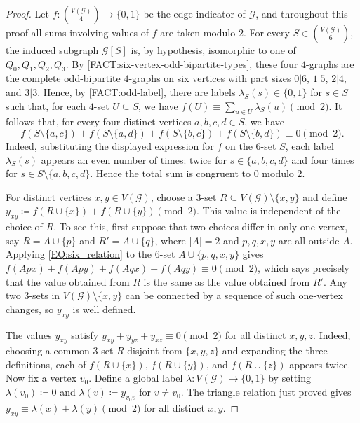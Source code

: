 \documentclass[10pt,a4paper]{article}
\theoremstyle{plain}
\theoremstyle{definition}
\begin{document}
\begin{proof}
Let $f:\binom{V(\mathcal G)}4\to\{0,1\}$ be the edge indicator of $\mathcal G$, and throughout this proof all sums involving values of $f$ are taken modulo $2$.  For every $S\in\binom{V(\mathcal G)}6$, the induced subgraph $\mathcal G[S]$ is, by hypothesis, isomorphic to one of $Q_0,Q_1,Q_2,Q_3$.  By \cref{FACT:six-vertex-odd-bipartite-types}, these four $4$-graphs are the complete odd-bipartite $4$-graphs on six vertices with part sizes $0|6$, $1|5$, $2|4$, and $3|3$.  Hence, by \cref{FACT:odd-label}, there are labels $\lambda_S(s)\in\{0,1\}$ for $s\in S$ such that, for each $4$-set $U\subseteq S$, we have $f(U)\equiv \sum_{u\in U}\lambda_S(u)\pmod 2$. 
It follows that, for every four distinct vertices $a,b,c,d\in S$, we have
\begin{equation}\label{EQ:six_relation}
f(S\setminus\{a,c\})+f(S\setminus\{a,d\})+f(S\setminus\{b,c\})+f(S\setminus\{b,d\})\equiv 0\pmod 2.
\end{equation}
Indeed, substituting the displayed expression for $f$ on the $6$-set $S$, each label $\lambda_S(s)$ appears an even number of times: twice for $s\in\{a,b,c,d\}$ and four times for $s\in S\setminus\{a,b,c,d\}$. Hence the total sum is congruent to $0$ modulo $2$.

For distinct vertices $x,y\in V(\mathcal G)$, choose a $3$-set $R\subseteq V(\mathcal G)\setminus\{x,y\}$ and define $y_{xy}\coloneqq f(R\cup\{x\})+f(R\cup\{y\})\pmod 2$.
This value is independent of the choice of $R$.  To see this, first suppose that two choices differ in only one vertex, say $R=A\cup\{p\}$ and $R'=A\cup\{q\}$, where $|A|=2$ and $p,q,x,y$ are all outside $A$.  Applying \eqref{EQ:six_relation} to the $6$-set $A\cup\{p,q,x,y\}$ gives $f(Apx)+f(Apy)+f(Aqx)+f(Aqy)\equiv 0\pmod 2$,
which says precisely that the value obtained from $R$ is the same as the value obtained from $R'$.  Any two $3$-sets in $V(\mathcal G)\setminus\{x,y\}$ can be connected by a sequence of such one-vertex changes, so $y_{xy}$ is well defined.

The values $y_{xy}$ satisfy $y_{xy}+y_{yz}+y_{xz}\equiv 0\pmod 2$ for all distinct $x,y,z$.  Indeed, choosing a common $3$-set $R$ disjoint from $\{x,y,z\}$ and expanding the three definitions, each of $f(R\cup\{x\})$, $f(R\cup\{y\})$, and $f(R\cup\{z\})$ appears twice.  Now fix a vertex $v_0$.  Define a global label $\lambda:V(\mathcal G)\to\{0,1\}$ by setting $\lambda(v_0)\coloneqq 0$ and $\lambda(v)\coloneqq y_{v_0v}$ for $v\ne v_0$.
The triangle relation just proved gives $y_{xy}\equiv \lambda(x)+\lambda(y)\pmod 2$ for all distinct $x,y$.


\end{proof}
\end{document}
